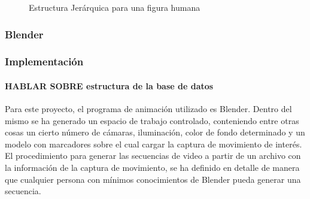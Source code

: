 \begin{figure}[H]
   \caption{Estructura Jerárquica para una figura humana}
  \label{img_espacio_capura}
\end{figure}   






\subsubsection{Blender}

\subsubsection{Implementación}



\paragraph{HABLAR SOBRE estructura de la base de datos}

Para este proyecto, el programa de animación utilizado es Blender. Dentro del mismo se ha generado un espacio de trabajo controlado, conteniendo entre otras cosas un cierto número de cámaras, iluminación, color de fondo determinado y un modelo con marcadores sobre el cual cargar la captura de movimiento de interés. \\

El procedimiento para generar las secuencias de video a partir de un archivo con la información de la captura de movimiento, se ha definido en detalle de manera que cualquier persona con mínimos conocimientos de Blender pueda generar una secuencia. 



